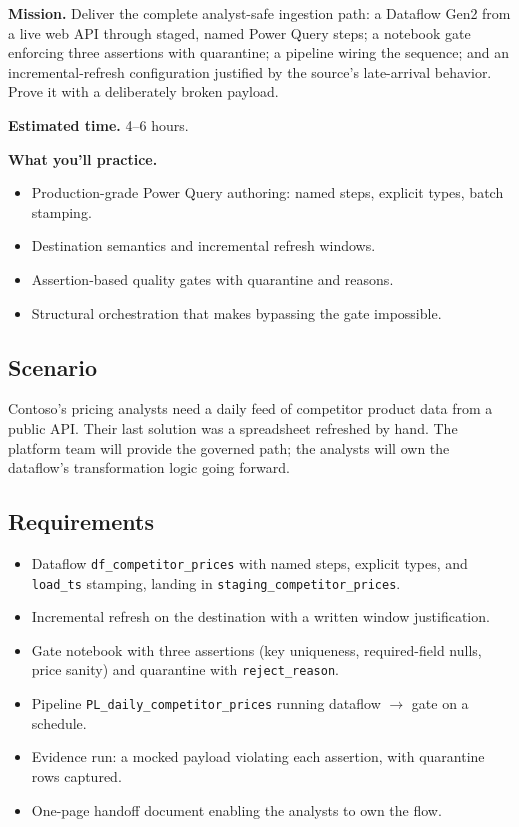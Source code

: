 \begin{capstonebox}
\textbf{Mission.} Deliver the complete analyst-safe ingestion path: a Dataflow Gen2 from a live web API through staged, named Power Query steps; a notebook gate enforcing three assertions with quarantine; a pipeline wiring the sequence; and an incremental-refresh configuration justified by the source's late-arrival behavior. Prove it with a deliberately broken payload.

\textbf{Estimated time.} 4--6 hours.

\textbf{What you'll practice.}
\begin{itemize}
    \item Production-grade Power Query authoring: named steps, explicit types, batch stamping.
    \item Destination semantics and incremental refresh windows.
    \item Assertion-based quality gates with quarantine and reasons.
    \item Structural orchestration that makes bypassing the gate impossible.
\end{itemize}
\end{capstonebox}

\subsection*{Scenario}
Contoso's pricing analysts need a daily feed of competitor product data from a public API. Their last solution was a spreadsheet refreshed by hand. The platform team will provide the governed path; the analysts will own the dataflow's transformation logic going forward.

\subsection*{Requirements}
\begin{itemize}
    \item Dataflow \texttt{df\_competitor\_prices} with named steps, explicit types, and \texttt{load\_ts} stamping, landing in \texttt{staging\_competitor\_prices}.
    \item Incremental refresh on the destination with a written window justification.
    \item Gate notebook with three assertions (key uniqueness, required-field nulls, price sanity) and quarantine with \texttt{reject\_reason}.
    \item Pipeline \texttt{PL\_daily\_competitor\_prices} running dataflow $\rightarrow$ gate on a schedule.
    \item Evidence run: a mocked payload violating each assertion, with quarantine rows captured.
    \item One-page handoff document enabling the analysts to own the flow.
\end{itemize}

